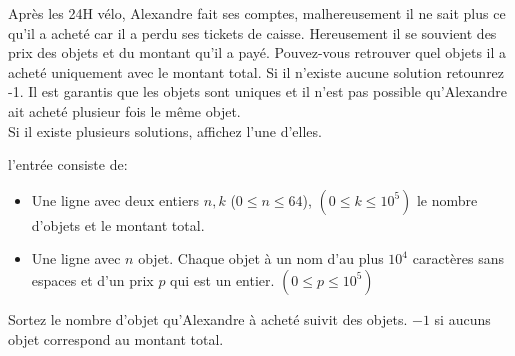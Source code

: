 \problemname{\problemyamlname}

\newcommand{\maxk}{10^5}
\newcommand{\maxn}{64}

Après les 24H vélo, Alexandre fait ses comptes, malhereusement il ne sait plus ce qu'il a acheté car il a perdu ses tickets de caisse. Hereusement il se souvient des prix des objets et du montant qu'il a payé. Pouvez-vous retrouver quel objets il a acheté uniquement avec le montant total. Si il n'existe aucune solution retounrez -1. Il est garantis que les objets sont uniques et il n'est pas possible qu'Alexandre ait acheté plusieur fois le même objet. \\
Si il existe plusieurs solutions, affichez l'une d'elles.

\begin{Input}
    l'entrée consiste de:
    \begin{itemize}
        \item Une ligne avec deux entiers $n, k$ ($0\leq n\leq \maxn$), $(0 \leq k \leq \maxk)$ le nombre d'objets et le montant total.
        \item Une ligne avec $n$ objet. Chaque objet à un nom d'au plus $10^4$ caractères sans espaces et d'un prix $p$ qui est un entier. $(0 \leq p \leq \maxk)$
    \end{itemize}
\end{Input}

\begin{Output}
    Sortez le nombre d'objet qu'Alexandre à acheté suivit des objets. $-1$ si aucuns objet correspond au montant total.
\end{Output}
